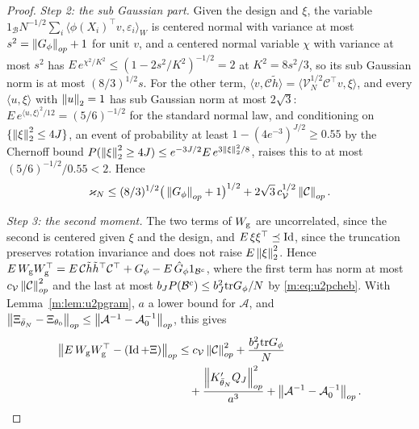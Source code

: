 \begin{proof}
\emph{Step 2: the sub Gaussian part.} Given the design and $\xi$, the variable $1_{\mathcal B}N^{-1/2}\sum_i\langle\phi(X_i)^\top v,\varepsilon_i\rangle_W$ is centered normal with variance at most $s^2=\left\|G_\phi\right\|_{op}+1$ for unit $v$, and a centered normal variable $\chi$ with variance at most $s^2$ has $E\,e^{\chi^2/K^2}\le(1-2s^2/K^2)^{-1/2}=2$ at $K^2=8s^2/3$, so its sub Gaussian norm is at most $(8/3)^{1/2}s$. For the other term, $\langle v,\mathcal C\tilde h\rangle=\langle\mathcal V_N^{1/2}\mathcal C^\top v,\xi\rangle$, and every $\langle u,\xi\rangle$ with $\left\|u\right\|_2=1$ has sub Gaussian norm at most $2\sqrt3$: $E\,e^{\langle u,\xi\rangle^2/12}=(5/6)^{-1/2}$ for the standard normal law, and conditioning on $\{\left\|\xi\right\|^2_2\le4J\}$, an event of probability at least $1-(4e^{-3})^{J/2}\ge0.55$ by the Chernoff bound $P(\left\|\xi\right\|^2_2\ge4J)\le e^{-3J/2}E\,e^{3\left\|\xi\right\|^2_2/8}$, raises this to at most $(5/6)^{-1/2}/0.55<2$. Hence
\[
\varkappa_N\le(8/3)^{1/2}\big(\left\|G_\phi\right\|_{op}+1\big)^{1/2}+2\sqrt3\,c_{\mathcal V}^{1/2}\left\|\mathcal C\right\|_{op} .
\]

\emph{Step 3: the second moment.} The two terms of $W_{\rm g}$ are uncorrelated, since the second is centered given $\xi$ and the design, and $E\,\xi\xi^\top\preceq\operatorname{Id}$, since the truncation preserves rotation invariance and does not raise $E\left\|\xi\right\|^2_2$. Hence $E\,W_{\rm g}W_{\rm g}^\top=E\,\mathcal C\tilde h\tilde h^\top\mathcal C^\top+G_\phi-E\,\hat G_\phi1_{\mathcal B^c}$, where the first term has norm at most $c_{\mathcal V}\left\|\mathcal C\right\|^2_{op}$ and the last at most $b_JP(\mathcal B^c)\le b_J^2\mathrm{tr} G_\phi/N$ by \eqref{m:eq:u2pcheb}. With Lemma~\ref{m:lem:u2pgram}, $a$ a lower bound for $\mathcal A$, and $\left\|\Xi_{\bar\theta_N}-\Xi_{\theta_0}\right\|_{op}\le\left\|\mathcal A^{-1}-\mathcal A_0^{-1}\right\|_{op}$, this gives
\[
\begin{aligned}
\big\|E\,W_{\rm g}W_{\rm g}^\top-(\operatorname{Id}+\Xi)\big\|_{op}&\le c_{\mathcal V}\left\|\mathcal C\right\|^2_{op}+\frac{b_J^2\mathrm{tr} G_\phi}N\\
&\quad+\frac{\left\|K'_{\bar\theta_N}Q_J\right\|^2_{op}}{a^3}+\left\|\mathcal A^{-1}-\mathcal A_0^{-1}\right\|_{op} .
\end{aligned}
\]


\end{proof}
